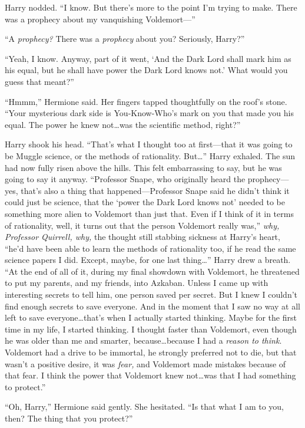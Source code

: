 Harry nodded. “I know. But there’s more to the point I’m trying to make. There was a prophecy about my vanquishing Voldemort—”

“A \emph{prophecy?} There was a \emph{prophecy} about you? Seriously, Harry?”

“Yeah, I know. Anyway, part of it went, ‘And the Dark Lord shall mark him as his equal, but he shall have power the Dark Lord knows not.’ What would you guess that meant?”

“Hmmm,” Hermione said. Her fingers tapped thoughtfully on the roof’s stone. “Your mysterious dark side is You-Know-Who’s mark on you that made you his equal. The power he knew not…was the scientific method, right?”

Harry shook his head. “That’s what I thought too at first—that it was going to be Muggle science, or the methods of rationality. But…” Harry exhaled. The sun had now fully risen above the hills. This felt embarrassing to say, but he was going to say it anyway. “Professor Snape, who originally heard the prophecy—yes, that’s also a thing that happened—Professor Snape said he didn’t think it could just be science, that the ‘power the Dark Lord knows not’ needed to be something more alien to Voldemort than just that. Even if I think of it in terms of rationality, well, it turns out that the person Voldemort really was,” \emph{why, Professor Quirrell, why,} the thought still stabbing sickness at Harry’s heart, “he’d have been able to learn the methods of rationality too, if he read the same science papers I did. Except, maybe, for one last thing…” Harry drew a breath. “At the end of all of it, during my final showdown with Voldemort, he threatened to put my parents, and my friends, into Azkaban. Unless I came up with interesting secrets to tell him, one person saved per secret. But I knew I couldn’t find enough secrets to save everyone. And in the moment that I saw no way at all left to save everyone…that’s when I actually started thinking. Maybe for the first time in my life, I started thinking. I thought faster than Voldemort, even though he was older than me and smarter, because…because I had a \emph{reason to think}. Voldemort had a drive to be immortal, he strongly preferred not to die, but that wasn’t a positive desire, it was \emph{fear,} and Voldemort made mistakes because of that fear. I think the power that Voldemort knew not…was that I had something to protect.”

“Oh, Harry,” Hermione said gently. She hesitated. “Is that what I am to you, then? The thing that you protect?”

